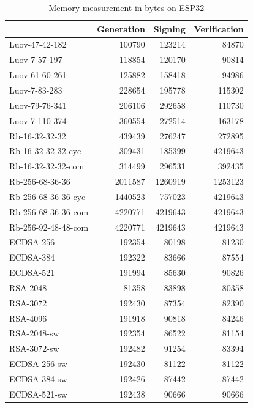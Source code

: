 \documentclass[thesis=M,english]{FITthesis}[2019/12/23]
\begin{document}
\begin{table}[]
\centering
\begin{tabular}{|l|r|r|r|}
\hline
& \multicolumn{1}{l|}{Generation} & \multicolumn{1}{l|}{Signing} & \multicolumn{1}{l|}{Verification} \\ \hline
Luov-47-42-182 & 100790 & 123214 & 84870 \\ \hline
Luov-7-57-197 & 118854 & 120170 & 90814 \\ \hline
Luov-61-60-261 & 125882 & 158418 & 94986 \\ \hline
Luov-7-83-283 & 228654 & 195778 & 115302 \\ \hline
Luov-79-76-341 & 206106 & 292658 & 110730 \\ \hline
Luov-7-110-374 & 360554 & 272514 & 163178 \\ \hline
Rb-16-32-32-32 & 439439 & 276247 & 272895 \\ \hline
Rb-16-32-32-32-cyc & 309431 & 185399 & 4219643 \\ \hline
Rb-16-32-32-32-com & 314499 & 296531 & 392435 \\ \hline
Rb-256-68-36-36 & 2011587 & 1260919 & 1253123 \\ \hline
Rb-256-68-36-36-cyc & 1440523 & 757023 & 4219643 \\ \hline
Rb-256-68-36-36-com & 4220771 & 4219643 & 4219643 \\ \hline
Rb-256-92-48-48-com & 4220771 & 4219643 & 4219643 \\ \hline
ECDSA-256 & 192354 & 80198 & 81230 \\ \hline
ECDSA-384 & 192322 & 83666 & 87554 \\ \hline
ECDSA-521 & 191994 & 85630 & 90826 \\ \hline
RSA-2048 & 81358 & 83898 & 80358 \\ \hline
RSA-3072 & 192430 & 87354 & 82390 \\ \hline
RSA-4096 & 191918 & 90818 & 84246 \\ \hline
RSA-2048-sw & 192354 & 86522 & 81154 \\ \hline
RSA-3072-sw & 192482 & 91254 & 83394 \\ \hline
ECDSA-256-sw & 192430 & 81122 & 81122 \\ \hline
ECDSA-384-sw & 192426 & 87442 & 87442 \\ \hline
ECDSA-521-sw & 192438 & 90666 & 90666 \\ \hline
\end{tabular}
\caption{Memory measurement in bytes on ESP32}
\end{table}
\end{document}
